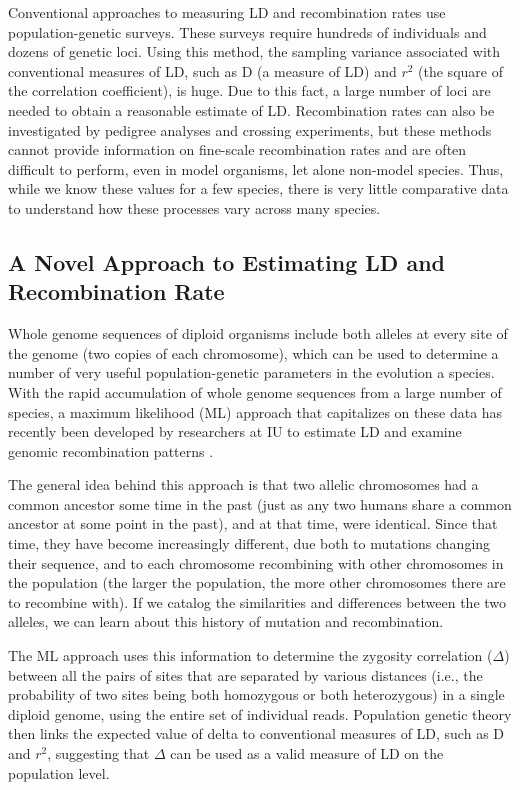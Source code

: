 \documentclass{sig-alternate}
\begin{document}
Conventional approaches to measuring LD and recombination rates use population-genetic surveys. These surveys
require hundreds of individuals and dozens of genetic loci. Using this method, the sampling variance
associated with conventional measures of LD, such as D (a measure of LD) and $r^2$ (the square of the
correlation coefficient), is huge. Due to this fact, a large number of loci are needed to obtain a reasonable
estimate of LD.  Recombination rates can also be investigated by pedigree analyses and crossing experiments,
but these methods cannot provide information on fine-scale recombination rates and are often difficult to
perform, even in model organisms, let alone non-model species. Thus, while we know these values for a few
species, there is very little comparative data to understand how these processes vary across many species.

\subsection{ A Novel Approach to Estimating LD and Recombination Rate}\label{sec:migration}
Whole genome sequences of diploid organisms include both alleles at every site of the genome (two copies of
each chromosome), which can be used to determine a number of very useful population-genetic parameters in the
evolution a species. With the rapid accumulation of whole genome sequences from a large number of species, a
maximum likelihood (ML) approach that capitalizes on these data has recently been developed by researchers at
IU to estimate LD and examine genomic recombination patterns \cite{Lynch01112008,MEC:MEC4482}.

The general idea behind this approach is that two allelic chromosomes had a common ancestor some time in the past (just as any two humans share a common ancestor at some point in the past), and at that time, were identical. Since that time, they have become increasingly different, due both to mutations changing their sequence, and to each chromosome recombining with other chromosomes in the population (the larger the population, the more other chromosomes there are to recombine with). If we catalog the similarities and differences between the two alleles, we can learn about this history of mutation and recombination. 

The ML approach uses this information to determine the zygosity correlation ($\Delta$) between all the pairs of sites that are separated by various distances (i.e., the probability of two sites being both homozygous or both heterozygous) in a single diploid genome, using the entire set of individual reads. Population genetic theory then links the expected value of delta to conventional measures of LD, such as D and $r^2$, suggesting that $\Delta$ can be used as a valid measure of LD on the population level.
\end{document}
